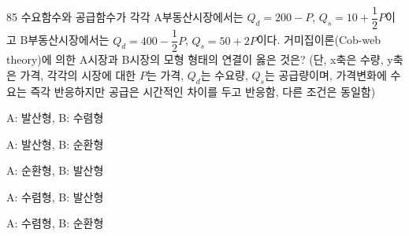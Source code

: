 \begin{question}{85}
수요함수와 공급함수가 각각 A부동산시장에서는 $Q_d=200-P$, $Q_s=10+\dfrac{1}{2}P$이고 B부동산시장에서는 $Q_d=400-\dfrac{1}{2}P$, $Q_s=50+2P$이다. 거미집이론(Cob-web theory)에 의한 A시장과 B시장의 모형 형태의 연결이 옳은 것은? (단, x축은 수량, y축은 가격, 각각의 시장에 대한 $P$는 가격, $Q_d$는 수요량, $Q_s$는 공급량이며, 가격변화에 수요는 즉각 반응하지만 공급은 시간적인 차이를 두고 반응함, 다른 조건은 동일함)
\begin{choices}
  \item A: 발산형, B: 수렴형
  \item A: 발산형, B: 순환형
  \item A: 순환형, B: 발산형
  \item A: 수렴형, B: 발산형
  \item A: 수렴형, B: 순환형
\end{choices}
\end{question}
